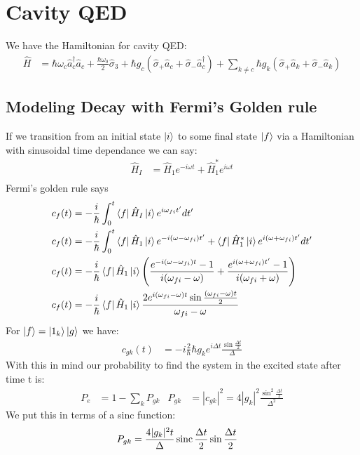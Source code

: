 \section{Cavity QED}
We have the Hamiltonian for cavity QED:
\begin{align*}
	\hat{H} &= \hbar\omega_c \hat{a}_c^\dagger\hat{a}_c + \frac{\hbar\omega_0}{2}\hat{\sigma}_3 + \hbar g_c (\hat{\sigma}_+\hat{a}_c + \hat{\sigma}_- \hat{a}_c^\dagger) + \sum_{k\neq c} \hbar g_k (\hat{\sigma}_+\hat{a}_k + \hat{\sigma}_-\hat{a}_k)
\end{align*}
\subsection{Modeling Decay with Fermi's Golden rule}
If we transition from an initial state $\ket{i}$ to some final state $\ket{f}$ via a Hamiltonian with sinusoidal time dependance we can say:
\begin{align*}
	\hat{H}_I &= \hat{H}_1 e^{-i\omega t} + \hat{H}_1^* e^{i\omega t} \\
\end{align*}
Fermi's golden rule says
\begin{align*}
	c_f(t) &= -\frac{i}{\hbar}\int_0^t \bra{f}\hat{H}_I\ket{i} e^{i\omega_{fi} t'}dt' \\
	c_f(t) &= -\frac{i}{\hbar}\int_0^t \bra{f}\hat{H}_1\ket{i} e^{-i(\omega -\omega_{fi}) t'} +\bra{f}\hat{H}_1^*\ket{i} e^{i(\omega +\omega_{fi}) t'} dt' \\
	c_f(t) &= -\frac{i}{\hbar} \bra{f}\hat{H}_1\ket{i} \left(\frac{e^{-i(\omega -\omega_{fi}) t}-1}{i(\omega_{fi}-\omega)} +\frac{e^{i(\omega +\omega_{fi}) t'}-1}{i(\omega_{fi} + \omega)}\right) \\
	c_f(t) &= -\frac{i}{\hbar} \bra{f}\hat{H}_1\ket{i} \frac{2e^{i(\omega_{fi}-\omega) t}\sin \frac{(\omega_{fi}-\omega)t}{2}}{\omega_{fi}-\omega}
\end{align*}
For $\ket{f} = \ket{1_k}\ket{g}$ we have:
\begin{align*}
	c_{gk}(t) &= -i\frac{2}{\hbar}\hbar g_k e^{i\Delta t} \frac{\sin\frac{\Delta t}{2}}{\Delta}
\end{align*}
With this in mind our probability to find the system in the excited state after time t is:
\begin{align*}
	P_e &= 1- \sum_k P_{gk} & P_{gk} &=|c_{gk}|^2 = 4|g_k|^2 \frac{\sin^2\frac{\Delta t}{2}}{\Delta^2}
\end{align*}
We put this in terms of a sinc function:
\begin{align*}
	P_{gk} &= \frac{4|g_k|^2 t}{\Delta}\operatorname{sinc}\frac{\Delta t}{2}\sin \frac{\Delta t}{2}
\end{align*}
